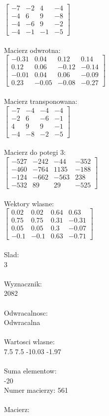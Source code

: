 \documentclass[a4paper,12pt]{article}
\begin{document}
$\begin{bmatrix} -7&-2&4&-4\\-4&6&9&-8\\-4&-6&9&-2\\-4&-1&-1&-5 \end{bmatrix}$
\\
\\
Macierz odwrotna:\\

$\begin{bmatrix} -0.31&0.04&0.12&0.14\\0.12&0.06&-0.12&-0.14\\-0.01&0.04&0.06&-0.09\\0.23&-0.05&-0.08&-0.27 \end{bmatrix}$
\\
\\
Macierz transponowana:\\

$\begin{bmatrix} -7&-4&-4&-4\\-2&6&-6&-1\\4&9&9&-1\\-4&-8&-2&-5 \end{bmatrix}$
\\
\\
Macierz do potegi 3:\\

$\begin{bmatrix} -527&-242&-44&-352\\-460&-764&1135&-188\\-124&-662&-563&238\\-532&89&29&-525 \end{bmatrix}$
\\
\\
Wektory wlasne:\\

$\begin{bmatrix} 0.02&0.02&0.64&0.63\\0.75&0.75&0.31&-0.31\\0.05&0.05&0.3&-0.07\\-0.1&-0.1&0.63&-0.71 \end{bmatrix}$
\\
\\
Slad:\\
3
\\
\\
Wyznacznik:\\
2082
\\
\\
Odwracalnosc:\\
Odwracalna
\\
\\
Wartosci wlasne:\\
7.5 7.5 -10.03 -1.97
\\
\\
Suma elementow:\\
-20
\\
\newpage
Numer macierzy:
561
\\
\\
Macierz:\\
\end{document}
